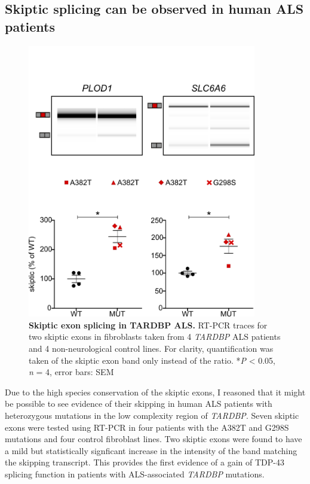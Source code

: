 \subsection{Skiptic splicing can be observed in human ALS patients}
\begin{figure}[h!]
	\centering
	\includegraphics[width=10cm]{Figures/05_tdp_mice/skiptic_patients.png}
	\caption[Skiptic exon splicing in TARDBP ALS]{
		\textbf{Skiptic exon splicing in TARDBP ALS.}
		RT-PCR traces for two skiptic exons in fibroblasts taken from 4 \textit{TARDBP} ALS patients and 4 non-neurological control lines. For clarity, quantification was taken of the skiptic exon band only instead of the ratio. *\textit{P} < 0.05, \textit{n} = 4, error bars: SEM
	}
	\label{fig:skiptic_patients}
\end{figure}

Due to the high species conservation of the skiptic exons, I reasoned that it might be possible to see evidence of their skipping in human ALS patients with heterozygous mutations in the low complexity region of \textit{TARDBP}. Seven skiptic exons were tested using RT-PCR in four patients with the A382T and G298S mutations and four control fibroblast lines. 
Two skiptic exons were found to have a mild but statistically signficant increase in the intensity of the band matching the skipping transcript.	
This provides the first evidence of a gain of TDP-43 splicing function in patients with ALS-associated \textit{TARDBP} mutations.


